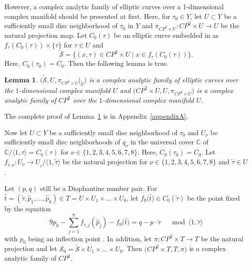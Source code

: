 \documentclass[10pt,a4paper]{amsart}
\numberwithin{equation}{section}
\newtheorem{Lemma}[Theorem]{Lemma}
\def\operatorname#1{#1}
\begin{document}
However, a complex analytic family of elliptic curves over a 1-dimensional complex manifold should be presented at first. Here, for $\tau_0\in Y$, let $U \subset Y$ be a sufficiently small disc neighborhood of $\tau_0$ in $Y$ and $\pi_{\operatorname{CP}^2 \times U}\colon \operatorname{CP}^2\times U\rightarrow U$ be the natural projection map. Let $C_0(\tau)$ be an elliptic curve embedded in
\smash{$\pi_{\operatorname{CP}^2\times U}^{-1}(\tau)=\operatorname{CP}^2 \times\{\tau\}$} as $f_{\tau}(C_0(\tau))\times \{ \tau \}$
for $\tau \in U$ and
\[\widetilde{\mathcal{S}}=\bigl\{ (x, \tau) \in \operatorname{CP}^2 \times U\mid x \in f_{\tau}(C_0(\tau)) \bigr\}.
\]
 Here, $C_0( \tau_0)=C_0$. Then the following lemma is true.

\begin{Lemma}\label{Lemma3.2}
\emph{$\bigl(\widetilde{\mathcal{S}},U,\pi_{\operatorname{CP}^2 \times U}|_{\widetilde{\mathcal{S}}}\bigr)$} is a complex analytic family of elliptic curves over the $1$-di\-men\-sion\-al complex manifold $U$ and \emph{$\bigl(\operatorname{CP}^2\times U, U,\pi_{\operatorname{CP}^2\times U}\bigr)$} is a complex analytic family of \emph{ $\operatorname{CP}^2$} over the $1$-dimensional complex manifold $U$.
\end{Lemma}

The complete proof of Lemma~\ref{Lemma3.2} is in Appendix~\ref{appendixA}.

Now let $U \subset Y$ be a sufficiently small disc neighborhood of $\tau_0$ and $U_\nu$ be sufficiently small disc neighborhoods of $q_\nu$ in the universal cover $\mathbb{C}$ of $ \mathbb{C}/ \langle 1,\tau \rangle=C_0({\tau})$ for $\nu \in \{1,2,3,4,5,6,7,8 \}$. Here, $C_0(\tau_0)=C_0$. Let $f_{\widetilde{\tau},\nu}\colon U_{\nu}\!\rightarrow U_{_\nu}/\langle 1, \widetilde{\tau}\rangle$ be the natural projection for $\nu \in \{1,2,3,4,5,6,7,8 \}$ and $\widetilde{\tau}\in U$.

Let $(p,q)$ still be a Diophantine number pair. For $\hat{t}=(\widetilde{\tau},\hat{p}_1,\dots ,\hat{p}_8)\in T =U \times U_1 \times \dots \times U_8$, let $f_9\bigl(\hat{t}\bigr) \in C_0(\widetilde{\tau})$ be the point fixed by the equation
\[9p_0-\sum _{j=1}^8f_{\widetilde{\tau},j}(\hat{p}_j)-f_9\bigl(\hat{t}\bigr)=q-p\cdot \widetilde{\tau} \quad \mod \langle 1, \widetilde{\tau} \rangle \]
with $p_0$ being an inflection point \cite{Takayuki-Takato2}. In addition, let $\pi\colon\operatorname{CP}^2 \times T \rightarrow T$ be the natural projection and let $\mathcal{S}_0=\widetilde{\mathcal{S}} \times U_1 \times \dots \times U_8$. Then $\bigl(\operatorname{CP}^2 \times T,T, \pi\bigr)$ is a complex analytic family of $\operatorname{CP}^2$.
\end{document}
